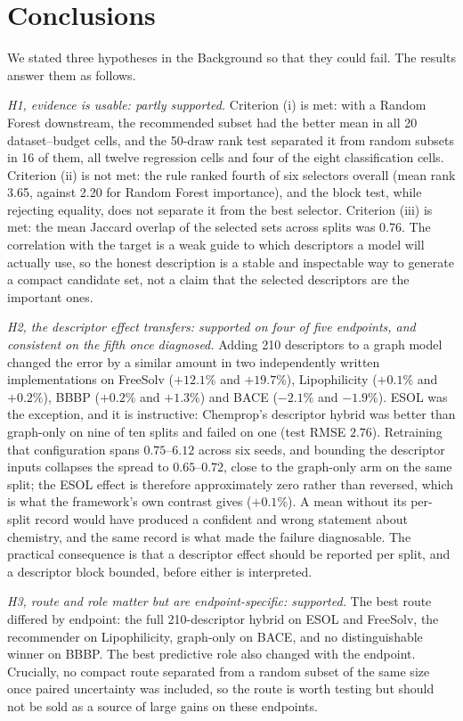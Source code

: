 \section{Conclusions}\label{sec:conclusion}

We stated three hypotheses in the Background so that they could fail. The results answer them as follows.

\emph{H1, evidence is usable: partly supported.} Criterion (i) is met: with a Random Forest downstream, the recommended subset had the better mean in all 20 dataset--budget cells, and the 50-draw rank test separated it from random subsets in 16 of them, all twelve regression cells and four of the eight classification cells. Criterion (ii) is not met: the rule ranked fourth of six selectors overall (mean rank 3.65, against 2.20 for Random Forest importance), and the block test, while rejecting equality, does not separate it from the best selector. Criterion (iii) is met: the mean Jaccard overlap of the selected sets across splits was 0.76. The correlation with the target is a weak guide to which descriptors a model will actually use, so the honest description is a stable and inspectable way to generate a compact candidate set, not a claim that the selected descriptors are the important ones.

\emph{H2, the descriptor effect transfers: supported on four of five endpoints, and consistent on the fifth once diagnosed.} Adding 210 descriptors to a graph model changed the error by a similar amount in two independently written implementations on FreeSolv ($+12.1\%$ and $+19.7\%$), Lipophilicity ($+0.1\%$ and $+0.2\%$), BBBP ($+0.2\%$ and $+1.3\%$) and BACE ($-2.1\%$ and $-1.9\%$). ESOL was the exception, and it is instructive: Chemprop's descriptor hybrid was better than graph-only on nine of ten splits and failed on one (test RMSE $2.76$). Retraining that configuration spans $0.75$--$6.12$ across six seeds, and bounding the descriptor inputs collapses the spread to $0.65$--$0.72$, close to the graph-only arm on the same split; the ESOL effect is therefore approximately zero rather than reversed, which is what the framework's own contrast gives ($+0.1\%$). A mean without its per-split record would have produced a confident and wrong statement about chemistry, and the same record is what made the failure diagnosable. The practical consequence is that a descriptor effect should be reported per split, and a descriptor block bounded, before either is interpreted.

\emph{H3, route and role matter but are endpoint-specific: supported.} The best route differed by endpoint: the full 210-descriptor hybrid on ESOL and FreeSolv, the recommender on Lipophilicity, graph-only on BACE, and no distinguishable winner on BBBP. The best predictive role also changed with the endpoint. Crucially, no compact route separated from a random subset of the same size once paired uncertainty was included, so the route is worth testing but should not be sold as a source of large gains on these endpoints.

